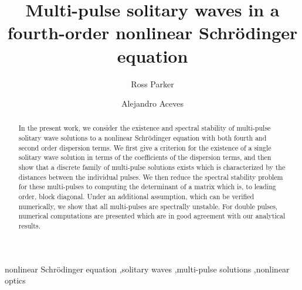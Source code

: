 \documentclass[12pt]{elsarticle}
\begin{document}
\begin{frontmatter}

\title{Multi-pulse solitary waves in a fourth-order nonlinear {S}chr{\"o}dinger equation}

\author[1]{Ross Parker}
\author[1]{Alejandro Aceves}

\address[1]{Department of Mathematics, Southern Methodist University, Dallas, Texas 75275}

\begin{abstract}
In the present work, we consider the existence and spectral stability of multi-pulse solitary wave solutions to a nonlinear Schr\"odinger equation with both fourth and second order dispersion terms. We first give a criterion for the existence of a single solitary wave solution in terms of the coefficients of the dispersion terms, and then show that a discrete family of multi-pulse solutions exists which is characterized by the distances between the individual pulses. We then reduce the spectral stability problem for these multi-pulses to computing the determinant of a matrix which is, to leading order, block diagonal. Under an additional assumption, which can be verified numerically, we show that all multi-pulses are spectrally unstable. For double pulses, numerical computations are presented which are in good agreement with our analytical results.
\end{abstract}

\begin{keyword}
nonlinear Schr\"{o}dinger equation \sep solitary waves \sep multi-pulse solutions \sep nonlinear optics 
\end{keyword}

\end{frontmatter}
\end{document}
